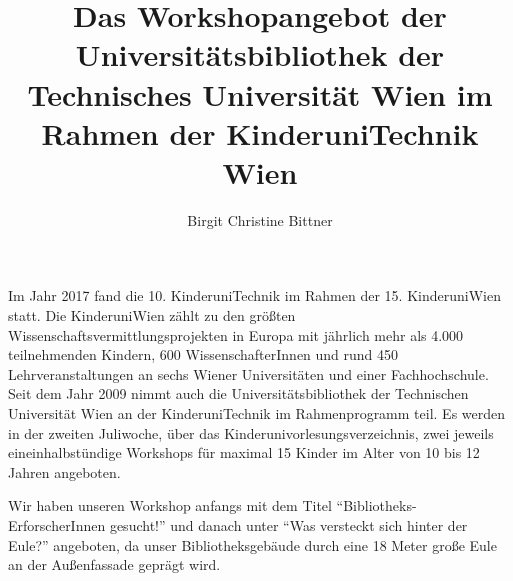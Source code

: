 \documentclass[a4paper,
fontsize=11pt,
oneside,
numbers=noperiodatend,
parskip=half-,
bibliography=totoc,
final
]{scrartcl}
\title{\LARGE{Das Workshopangebot der Universitätsbibliothek der Technisches Universität Wien im Rahmen der KinderuniTechnik Wien}} %
\author{Birgit Christine Bittner} %
\date{}
\begin{document}
\maketitle
\thispagestyle{fancyplain} 


Im Jahr 2017 fand die 10. KinderuniTechnik im Rahmen der 15.
KinderuniWien statt. Die KinderuniWien zählt zu den größten
Wissenschaftsvermittlungsprojekten in Europa mit jährlich mehr als 4.000
teilnehmenden Kindern, 600 WissenschafterInnen und rund 450
Lehrveranstaltungen an sechs Wiener Universitäten und einer
Fachhochschule. Seit dem Jahr 2009 nimmt auch die Universitätsbibliothek
der Technischen Universität Wien an der KinderuniTechnik im
Rahmenprogramm teil. Es werden in der zweiten Juliwoche, über das
Kinderunivorlesungsverzeichnis, zwei jeweils eineinhalbstündige
Workshops für maximal 15 Kinder im Alter von 10 bis 12 Jahren angeboten.

Wir haben unseren Workshop anfangs mit dem Titel
\enquote{Bibliotheks-ErforscherInnen gesucht!} und danach unter
\enquote{Was versteckt sich hinter der Eule?} angeboten, da unser
Bibliotheksgebäude durch eine 18 Meter große Eule an der Außenfassade
geprägt wird.
\end{document}
